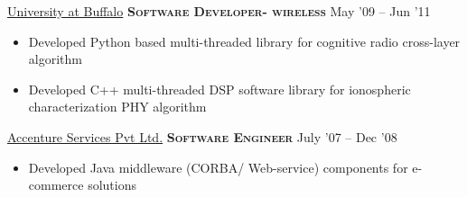 \documentclass[10pt,a4paper]{article} %
\begin{document}
\headedsection %
{\href{http://www.ece.neu.edu/wineslab/}{University at Buffalo}}
{\textsc{\textbf{Software Developer- wireless}}} {May '09 -- Jun '11}
	\bodytext
	{
	  \begin{itemize}
		\item Developed Python based multi-threaded library for cognitive radio cross-layer algorithm
		\item Developed C++ multi-threaded DSP software library for ionospheric characterization PHY algorithm
	  \end{itemize}
	}


\headedsection %
{\href{http://www.accenture.com/}{Accenture Services Pvt Ltd.}}
{\textsc{\textbf{Software Engineer}}} {July '07 -- Dec '08}
	\bodytext
	{
	  \begin{itemize}
		\item Developed Java middleware (CORBA/ Web-service) components for e-commerce solutions
	  \end{itemize}
	}

\spacedhrule{0.5em}{-0.4em} %

\end{document}
